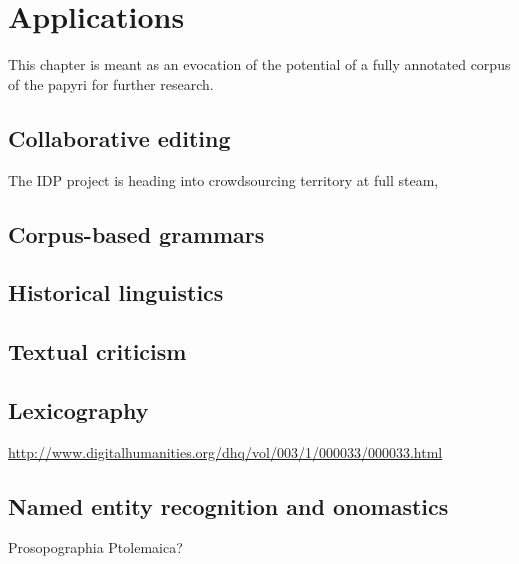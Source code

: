 \chapter{Applications} %
\label{cha:applications}
This chapter is meant as an evocation of the potential of a fully annotated corpus of the papyri for further research.

\section{Collaborative editing} %
\label{sec:collaborativeediting}
The IDP project is heading into crowdsourcing territory at full steam, 

\section{Corpus-based grammars} %
\label{sec:corpusbasedgrammars}


\section{Historical linguistics} %
\label{sec:histlinguistics}



\section{Textual criticism} %
\label{sec:textualcriticism}


\section{Lexicography} %
\label{sec:lexicography}

\url{http://www.digitalhumanities.org/dhq/vol/003/1/000033/000033.html}


\section{Named entity recognition and onomastics} %
\label{sec:ner}

Prosopographia Ptolemaica?



